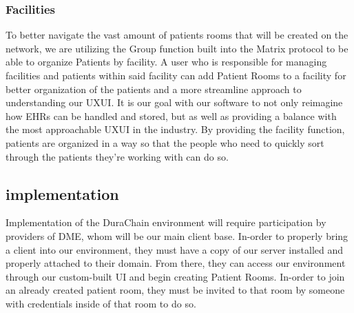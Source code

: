 \documentclass[12pt]{article}
\begin{document}


  \subsubsection{Facilities}
  To better navigate the vast amount of patients rooms that will be created on the network, we are utilizing the Group function built into the Matrix protocol to be able to organize Patients by facility. A user who is responsible for managing facilities and patients within said facility can add Patient Rooms to a facility for better organization of the patients and a more streamline approach to understanding our UXUI. It is our goal with our software to not only reimagine how EHRs can be handled and stored, but as well as providing a balance with the most approachable UXUI in the industry. By providing the facility function, patients are organized in a way so that the people who need to quickly sort through the patients they’re working with can do so.

\subsection{implementation}
Implementation of the DuraChain environment will require participation by providers of DME, whom will be our main client base. In-order to properly bring a client into our environment, they must have a copy of our server installed and properly attached to their domain. From there, they can access our environment through our custom-built UI and begin creating Patient Rooms. In-order to join an already created patient room, they must be invited to that room by someone with credentials inside of that room to do so.
\end{document}
